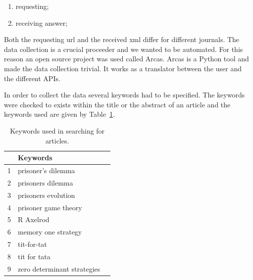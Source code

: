 \documentclass{article}
\begin{document}
\begin{enumerate}
    \item requesting;
    \item receiving answer;
\end{enumerate}

\begin{figure}[!hbtp]
    \begin{center}
    
    \end{center}
\end{figure}

Both the requesting url and the received xml differ for different journals.
The data collection is a crucial proceeder and we wanted to be automated. For
this reason an open source project was used called Arcas. Arcas is
a Python tool and made the data collection trivial. It works as a translator
between the user and the different APIs.

In order to collect the data several keywords had to be specified. The keywords
were checked to exists within the title or the abstract of an article and the 
keywords used are given by Table~\ref{table:search_keywords}. 

\begin{table}[!hbtp]
    \begin{center}
        \begin{tabular}{lll}
            \toprule
             & Keywords & \\
            \midrule
             1 &  prisoner's dilemma & \\
             2 &  prisoners dilemma  & \\  
             3 &  prisoners evolution & \\
             4 &  prisoner game theory & \\
             5 &  R Axelrod & \\
             6 &  memory one strategy & \\
             7 & tit-for-tat & \\
             8 & tit for tata & \\
             9 & zero determinant strategies & \\
            \bottomrule
        \end{tabular}
    \end{center}
    \caption{Keywords used in searching for articles.}
    \label{table:search_keywords}
\end{table}
\end{document}

